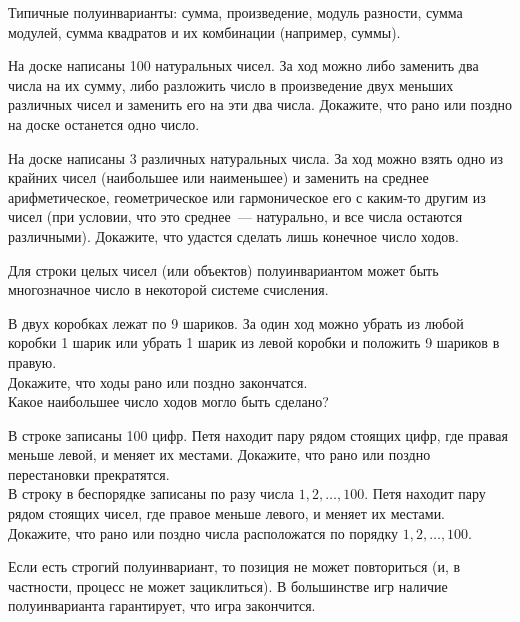 Типичные полуинварианты: сумма, произведение, модуль разности, сумма модулей,
сумма квадратов и их комбинации (например, суммы).

\begin{problems}

\item
На доске написаны 100 натуральных чисел.
За ход можно либо заменить два числа на их сумму, либо разложить число
в произведение двух меньших различных чисел и заменить его на эти два числа.
Докажите, что рано или поздно на доске останется одно число.

\item
На доске написаны 3 различных натуральных числа.
За ход можно взять одно из крайних чисел (наибольшее или наименьшее) и заменить
на среднее арифметическое, геометрическое или гармоническое его с каким-то
другим из чисел (при условии, что это среднее~--- натурально, и все числа
остаются различными).
Докажите, что удастся сделать лишь конечное число ходов.

\end{problems}

Для строки целых чисел (или объектов) полуинвариантом может быть многозначное
число в некоторой системе счисления.

\begin{problems}

\item
В двух коробках лежат по 9 шариков.
За один ход можно убрать из любой коробки 1 шарик или убрать 1 шарик из левой
коробки и положить 9 шариков в правую.
\\
\subproblem
Докажите, что ходы рано или поздно закончатся.
\\
\subproblem
Какое наибольшее число ходов могло быть сделано?

\item
\subproblem
В строке записаны 100 цифр.
Петя находит пару рядом стоящих цифр, где правая меньше левой, и меняет
их местами.
Докажите, что рано или поздно перестановки прекратятся.
\\
\subproblem
В строку в беспорядке записаны по разу числа $1, 2, \ldots, 100$.
Петя находит пару рядом стоящих чисел, где правое меньше левого, и меняет
их местами.
Докажите, что рано или поздно числа расположатся по порядку
$1, 2, \ldots, 100$.

\end{problems}

Если есть строгий полуинвариант, то позиция не может повториться
(и, в частности, процесс не может зациклиться).
В большинстве игр наличие полуинварианта гарантирует, что игра закончится.

